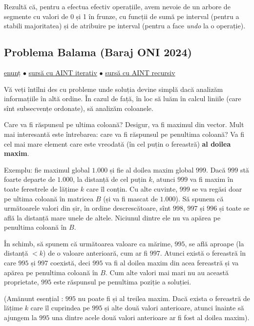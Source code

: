Rezultă că, pentru a efectua efectiv operațiile, avem nevoie de un arbore de segmente cu valori de 0 și 1 în frunze, cu funcții de sumă pe interval (pentru a stabili majoritatea) și de atribuire pe interval (pentru a face \textit{undo} la o operație).

\subsection{Problema Balama (Baraj ONI 2024)}

\href{https://kilonova.ro/problems/2666}{enunț}
$\bullet$
\href{https://kilonova.ro/submissions/800609}{sursă cu AINT iterativ}
$\bullet$
\href{https://kilonova.ro/submissions/367617}{sursă cu AINT recursiv}

Vă veți întîlni des cu probleme unde soluția devine simplă dacă analizăm informațiile în altă ordine. În cazul de față, în loc să luăm în calcul liniile (care sînt subsecvențe ordonate), să analizăm coloanele.

Care va fi răspunsul pe ultima coloană? Desigur, va fi maximul din vector. Mult mai interesantă este întrebarea: care va fi răspunsul pe penultima coloană? Va fi cel mai mare element care este vreodată (în cel puțin o fereastră) \textbf{al doilea maxim}.

Exemplu: fie maximul global $1.000$ și fie al doilea maxim global $999$. Dacă $999$ stă foarte departe de $1.000$, la distanță de cel puțin $k$, atunci $999$ va fi maxim în toate ferestrele de lățime $k$ care îl conțin. Cu alte cuvinte, $999$ se va regăsi doar pe ultima coloană în matricea $B$ (și va fi mascat de $1.000$). Să spunem că următoarele valori din șir, în ordine descrescătoare, sînt $998$, $997$ și $996$ și toate se află la distanță mare unele de altele. Niciunul dintre ele nu va apărea pe penultima coloană în $B$.

În schimb, să spunem că următoarea valoare ca mărime, $995$, se află aproape (la distanță $< k$) de o valoare anterioară, cum ar fi $997$. Atunci există o fereastră în care $995$ și $997$ coexistă, deci $995$ va fi al doilea maxim din acea fereastră și va apărea pe penultima coloană în $B$. Cum alte valori mai mari nu au această proprietate, $995$ este răspunsul pe penultima poziție a soluției.

(Amănunt esențial : $995$ nu poate fi și al treilea maxim. Dacă exista o fereastră de lățime $k$ care îl cuprindea pe $995$ și alte două valori anterioare, atunci înainte să ajungem la $995$ una dintre acele două valori anterioare ar fi fost al doilea maxim).

